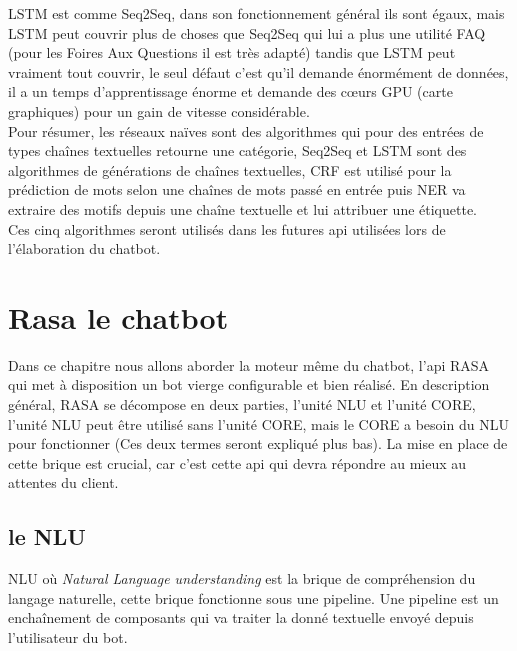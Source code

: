 LSTM est comme Seq2Seq, dans son fonctionnement général ils sont égaux, mais LSTM peut couvrir plus de choses que Seq2Seq qui lui a plus une utilité FAQ (pour les Foires Aux Questions il est très adapté) tandis que LSTM peut vraiment tout couvrir, le seul défaut c'est qu'il demande énormément de données, il a un temps d'apprentissage énorme et demande des cœurs GPU (carte graphiques) pour un gain de vitesse considérable.\\

\pagebreak
Pour résumer, les réseaux naïves sont des algorithmes qui pour des entrées de types chaînes textuelles retourne une catégorie, Seq2Seq et LSTM sont des algorithmes de générations de chaînes textuelles, CRF est utilisé pour la prédiction de mots selon une chaînes de mots passé en entrée puis NER va extraire des motifs depuis une chaîne textuelle et lui attribuer une étiquette.\\
\linebreak
Ces cinq algorithmes seront utilisés dans les futures api utilisées lors de l'élaboration du chatbot.\\
\pagebreak

\chapter{Rasa le chatbot}

Dans ce chapitre nous allons aborder la moteur même du chatbot, l'api RASA qui met à disposition un bot vierge configurable et bien réalisé. \linebreak
En description général, RASA se décompose en deux parties, l'unité NLU et l'unité CORE, l'unité NLU peut être utilisé sans l'unité CORE, mais le CORE a besoin du NLU pour fonctionner (Ces deux termes seront expliqué plus bas).
La mise en place de cette brique est crucial, car c'est cette api qui devra répondre au mieux au attentes du client.

\pagebreak
\section{le NLU}
NLU où \textit{Natural Language understanding} est la brique de compréhension du langage naturelle, cette brique fonctionne sous une pipeline. Une pipeline est un enchaînement de composants qui va traiter la donné textuelle envoyé depuis l'utilisateur du bot.\\
\linebreak

